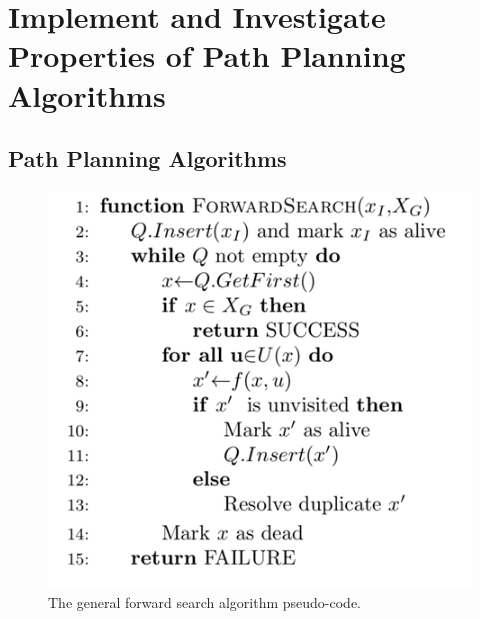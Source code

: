 \documentclass[a4paper,12pt]{article}
\begin{document}
	\pagebreak
	
	\tableofcontents
	
	\pagebreak
	
	\section{Implement and Investigate Properties of Path Planning Algorithms}
		
	\subsection{Path Planning Algorithms}
			
			\begin{figure}[H]
				\renewcommand\thefigure{1.1}
				\centering
				
				\includegraphics[scale=0.6]{images/general_forward_search_pseudocode.png}
				\caption{The general forward search algorithm pseudo-code. }
			\end{figure}
			
\end{document}
